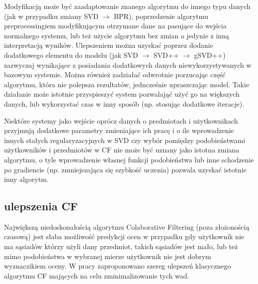 \documentclass{pracamgr}
\begin{document}
   Modyfikacją może być zaadaptowanie znanego algorytmu do innego typu danych (jak w przypadku zmiany SVD $\rightarrow$ BPR),
   poprzedzenie algorytmu preprocessingiem modyfikującym otrzymane dane na pasujące do wejścia normalnego systemu,
   lub też użycie algorytmu bez zmian a jedynie z inną interpretacją wyników.
   Ulepszeniem można uzyskać poprzez dodanie dodatkowego elementu do modelu (jak SVD $\rightarrow$ SVD++ $\rightarrow$ gSVD++)
   zazwyczaj wynikające z posiadania dodatkowych danych niewykorzystywanych w bazowym systemie.
   Można również zadziałać odwrotnie porzucając część algorytmu, która nie polepsza rezultatów, jedncześnie upraszczając model.
   Takie działanie może istotnie przyspieszyć system pozwalająć użyć go na większych danych, lub wykorzystać czas w inny sposób
   (np. stosując dodatkowe iteracje).
   
   Niektóre systemy jako wejście oprócz danych o predmiotach i użytkownikach przyjmują dodatkowe parametry zmieniające ich pracę i o ile
   wprowadzenie innych stałych regularyzacyjnych w SVD czy wybór pomiędzy podobieństwami użytkowników i przedmiotów w CF nie może być uznany jako
   istotna zmiana algorytmu, o tyle wprowadzenie własnej funkcji podobieństwa lub inne schodzenie po gradiencie (np. zmniejszająca się szybkość uczenia)
   pozwala uzyskać istotnie inny algorytm.

   
   
   \subsection{ulepszenia CF}
    Największą niedoskonałością algorytmu Colaborative Filtering (poza złożonością czasową) jest słaba możliwość predykcji ocen w przypadku gdy użytkownik nie
    ma sąsiadów którzy użyli dany przedmiot, takich sąsiadów jest mało,
    lub też mimo podobieństwa w wybranej mierze użytkownik nie jest dobrym wyznaczikiem oceny.\newline
    W pracy \cite{221} zaproponowano szereg ulepszeń klasycznego algorytmu CF mających na celu zminimalizowanie tych wad.
\end{document}
